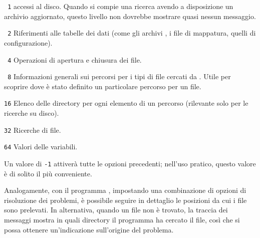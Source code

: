 \documentclass{article}
\begin{document}
\begin{ttdescription}
\item[\texttt{\ 1}] accessi al disco. Quando si compie una ricerca avendo
  a disposizione un archivio  aggiornato, questo livello non
  dovrebbe mostrare quasi nessun messaggio.
\item[\texttt{\ 2}] Riferimenti alle tabelle dei dati (come gli archivi
  , i file di mappatura, quelli di configurazione).
\item[\texttt{\ 4}] Operazioni di apertura e chiusura dei file.
\item[\texttt{\ 8}] Informazioni generali sui percorsi per i tipi di file
  cercati da \KPS. Utile per scoprire dove è stato definito un particolare
  percorso per un file.
\item[\texttt{16}] Elenco delle directory per ogni elemento di un percorso
  (rilevante solo per le ricerche su disco).
\item[\texttt{32}] Ricerche di file.
\item[\texttt{64}] Valori delle variabili.
\end{ttdescription}
Un valore di \texttt{-1} attiverà tutte le opzioni precedenti; nell'uso
pratico, questo valore è di solito il più conveniente.

Analogamente, con il programma , impostando una
combinazione di opzioni di risoluzione dei problemi, è possibile seguire
in dettaglio le posizioni da cui i file sono prelevati. In alternativa,
quando un file non è trovato, la traccia dei messaggi mostra in quali
directory il programma ha cercato il file, così che si possa ottenere
un'indicazione sull'origine del problema.
\end{document}
